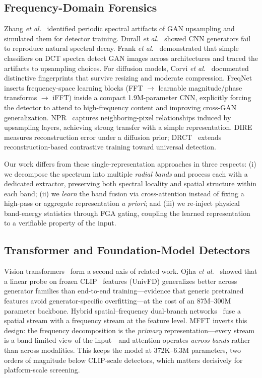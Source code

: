 \documentclass[journal]{IEEEtran}
\begin{document}
\subsection{Frequency-Domain Forensics}
Zhang \textit{et al.}~\cite{zhang2019wifs} identified periodic spectral artifacts of GAN upsampling and simulated them for detector training. Durall \textit{et al.}~\cite{durall2020} showed CNN generators fail to reproduce natural spectral decay. Frank \textit{et al.}~\cite{frank2020} demonstrated that simple classifiers on DCT spectra detect GAN images across architectures and traced the artifacts to upsampling choices. For diffusion models, Corvi \textit{et al.}~\cite{corvi2023} documented distinctive fingerprints that survive resizing and moderate compression. FreqNet~\cite{tan2024freqnet} inserts frequency-space learning blocks (FFT $\rightarrow$ learnable magnitude/phase transforms $\rightarrow$ iFFT) inside a compact 1.9M-parameter CNN, explicitly forcing the detector to attend to high-frequency content and improving cross-GAN generalization. NPR~\cite{tan2024npr} captures neighboring-pixel relationships induced by upsampling layers, achieving strong transfer with a simple representation. DIRE~\cite{wang2023dire} measures reconstruction error under a diffusion prior; DRCT~\cite{chen2024drct} extends reconstruction-based contrastive training toward universal detection.

Our work differs from these single-representation approaches in three respects: (i) we decompose the spectrum into multiple \emph{radial bands} and process each with a dedicated extractor, preserving both spectral locality and spatial structure within each band; (ii) we \emph{learn} the band fusion via cross-attention instead of fixing a high-pass or aggregate representation \textit{a priori}; and (iii) we re-inject physical band-energy statistics through FGA gating, coupling the learned representation to a verifiable property of the input.

\subsection{Transformer and Foundation-Model Detectors}
Vision transformers~\cite{dosovitskiy2021,touvron2021,liu2021} form a second axis of related work. Ojha \textit{et al.}~\cite{ojha2023} showed that a linear probe on frozen CLIP~\cite{radford2021} features (UnivFD) generalizes better across generator families than end-to-end training---evidence that generic pretrained features avoid generator-specific overfitting---at the cost of an 87M--300M parameter backbone. Hybrid spatial--frequency dual-branch networks~\cite{miao2023hierarchical} fuse a spatial stream with a frequency stream at the feature level. MFFT inverts this design: the frequency decomposition is the \emph{primary} representation---every stream is a band-limited view of the input---and attention operates \emph{across bands} rather than across modalities. This keeps the model at 372K--6.3M parameters, two orders of magnitude below CLIP-scale detectors, which matters decisively for platform-scale screening.
\end{document}
